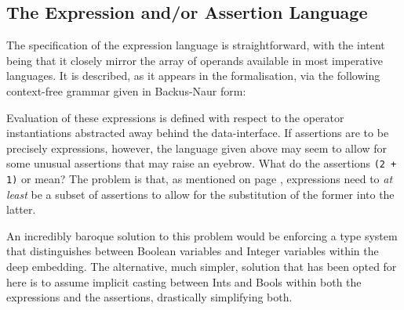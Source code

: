 \documentclass[oneside,12pt]{article}
\newcommand{\textM}[1]{\ensuremath{\mathpzc{#1}}}
\begin{document}
 
\subsection{The Expression and/or Assertion Language}
\label{sec:spec:expression-assertion-lang}

The specification of the expression language is straightforward, with the intent being that it closely mirror the array of operands available in most imperative languages. It is described, as it appears in the formalisation, via the following context-free grammar given in Backus-Naur form:



Evaluation of these expressions is defined with respect to the operator instantiations abstracted away behind the data-interface. If assertions are to be precisely expressions, however, the language given above may seem to allow for some unusual assertions that may raise an eyebrow. What do the assertions \texttt{(2 + 1)} or  mean? The problem is that, as mentioned on page \pageref{page:expassertionprob}, expressions need to \emph{at least} be a subset of assertions to allow for the substitution of the former into the latter.

An incredibly baroque solution to this problem would be enforcing a type system that distinguishes between Boolean variables and Integer variables within the deep embedding. The alternative, much simpler, solution that has been opted for here is to assume implicit casting between Ints and Bools within both the expressions and the assertions, drastically simplifying both.
\end{document}
